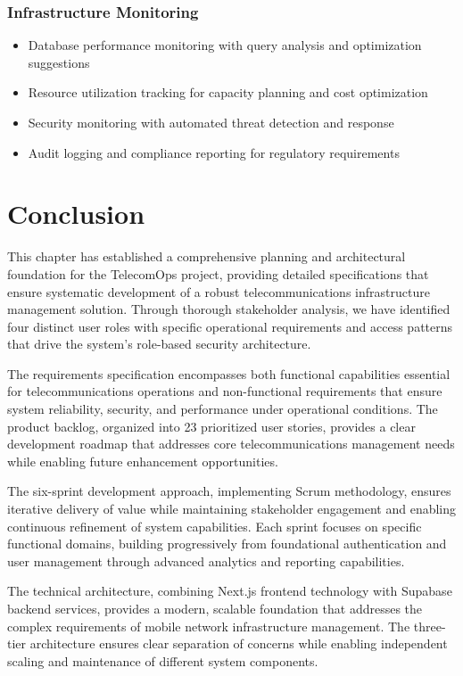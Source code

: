 \subsubsection{Infrastructure Monitoring}
\begin{itemize}
\item Database performance monitoring with query analysis and optimization suggestions
\item Resource utilization tracking for capacity planning and cost optimization
\item Security monitoring with automated threat detection and response
\item Audit logging and compliance reporting for regulatory requirements
\end{itemize}

\section*{Conclusion}

This chapter has established a comprehensive planning and architectural foundation for the TelecomOps project, providing detailed specifications that ensure systematic development of a robust telecommunications infrastructure management solution. Through thorough stakeholder analysis, we have identified four distinct user roles with specific operational requirements and access patterns that drive the system's role-based security architecture.

The requirements specification encompasses both functional capabilities essential for telecommunications operations and non-functional requirements that ensure system reliability, security, and performance under operational conditions. The product backlog, organized into 23 prioritized user stories, provides a clear development roadmap that addresses core telecommunications management needs while enabling future enhancement opportunities.

The six-sprint development approach, implementing Scrum methodology, ensures iterative delivery of value while maintaining stakeholder engagement and enabling continuous refinement of system capabilities. Each sprint focuses on specific functional domains, building progressively from foundational authentication and user management through advanced analytics and reporting capabilities.

The technical architecture, combining Next.js frontend technology with Supabase backend services, provides a modern, scalable foundation that addresses the complex requirements of mobile network infrastructure management. The three-tier architecture ensures clear separation of concerns while enabling independent scaling and maintenance of different system components.


